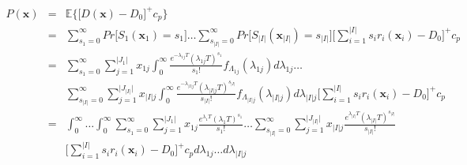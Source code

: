 \documentclass[preprint,12pt]{elsarticle}
\begin{document}
\begin{eqnarray}
P(\boldsymbol{x})& = & \mathbb{E}\bigg\{\bigg[D(\boldsymbol{x})-D_{0}\bigg]^{+} c_{p} \bigg\} \nonumber\\
&=&\sum_{s_{1}=0}^{\infty}{Pr\bigg[S_{1}(\boldsymbol{x}_{1})=s_{1}\bigg]}\dots\sum_{s_{\rvert I \lvert}=0}^{\infty}{Pr\bigg[S_{\rvert I \lvert}(\boldsymbol{x}_{\rvert I \lvert})=s_{\rvert I \lvert}\bigg]} \bigg[\sum_{i=1}^{\rvert I \lvert}{s_{i}r_{i}(\boldsymbol{x}_{i})}-D_{0}\bigg]^{+}c_{p} \nonumber\\
&=& \sum^{\infty}_{s_{1}=0}\sum^{\rvert J_{1} \lvert}_{j=1}{x_{1j}}\int^{\infty}_{0}{\frac{e^{-\lambda_{1j}T}(\lambda_{1j}T)^{s_{1}}}{s_{1}!}f_{\Lambda_{1j}}(\lambda_{1j})d\lambda_{1j}}\dots \nonumber\\
&&\sum^{\infty}_{s_{\rvert I \lvert}=0}\sum^{\rvert J_{\rvert I \lvert} \lvert}_{j=1}{x_{\rvert I \lvert j}}\int^{\infty}_{0}{\frac{e^{-\lambda_{\rvert I \lvert j}T}(\lambda_{\rvert I \lvert j}T)^{s_{\rvert I \lvert}}}{s_{\rvert I \lvert}!}f_{\Lambda_{\rvert I \lvert j}}(\lambda_{\rvert I \lvert j})d\lambda_{\rvert I \lvert j}}\bigg[\sum_{i=1}^{\rvert I \lvert}{s_{i}r_{i}(\boldsymbol{x}_{i})}-D_{0}\bigg]^{+}c_{p} \nonumber\\
&=&\int^{\infty}_{0}\dots\int^{\infty}_{0}{\sum_{s_{1}=0}^{\infty}\sum^{\rvert J_{1} \lvert}_{j=1}{x_{1j}\frac{e^{\lambda_{1}T}(\lambda_{1}T)^{s_{1}}}{s_{1}!}\dots \sum_{s_{\rvert I \lvert}=0}^{\infty}\sum^{\rvert J_{\rvert I \lvert} \lvert}_{j=1}{x_{\rvert I \lvert j}\frac{e^{\lambda_{\rvert I \lvert}T}(\lambda_{\rvert I \lvert}T)^{s_{\rvert I \lvert}}}{s_{\rvert I \lvert}!}}}}\nonumber\\
&&\bigg[\sum_{i=1}^{\rvert I \lvert}{s_{i}r_{i}(\boldsymbol{x}_{i})}-D_{0}\bigg]^{+}c_{p}d\lambda_{1j}\dots d\lambda_{\rvert I \lvert j}
\label{penaltycost}
\end{eqnarray}
\normalsize
\end{document}
